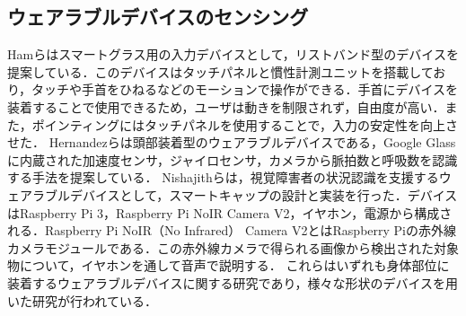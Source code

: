 \documentclass[submit,techrep]{ipsj}
\begin{document}
\subsection{ウェアラブルデバイスのセンシング}
Hamら\cite{smart_wristband}はスマートグラス用の入力デバイスとして，リストバンド型のデバイスを提案している．このデバイスはタッチパネルと慣性計測ユニットを搭載しており，タッチや手首をひねるなどのモーションで操作ができる．手首にデバイスを装着することで使用できるため，ユーザは動きを制限されず，自由度が高い．また，ポインティングにはタッチパネルを使用することで，入力の安定性を向上させた．
Hernandezら\cite{bioglass}は頭部装着型のウェアラブルデバイスである，Google Glassに内蔵された加速度センサ，ジャイロセンサ，カメラから脈拍数と呼吸数を認識する手法を提案している．
Nishajithら\cite{smart_cap}は，視覚障害者の状況認識を支援するウェアラブルデバイスとして，スマートキャップの設計と実装を行った．デバイスはRaspberry Pi 3，Raspberry Pi NoIR Camera V2，イヤホン，電源から構成される．Raspberry Pi NoIR（No Infrared） Camera V2とはRaspberry Piの赤外線カメラモジュールである．この赤外線カメラで得られる画像から検出された対象物について，イヤホンを通して音声で説明する．
これらはいずれも身体部位に装着するウェアラブルデバイスに関する研究であり，様々な形状のデバイスを用いた研究が行われている．
\par
\end{document}
